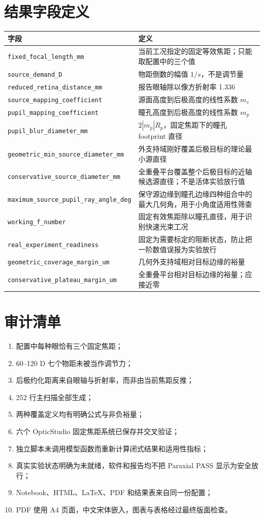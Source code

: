\documentclass[UTF8,zihao=-4,openany,fontset=none]{ctexrep}
\newcommand{\sourcefile}[1]{\nolinkurl{#1}}
\begin{document}
\chapter{结果字段定义}
\begin{longtable}{p{5.4cm}p{9.4cm}}
\toprule
字段 & 定义\\
\midrule
\sourcefile{fixed\_focal\_length\_mm} & 当前工况指定的固定等效焦距；只能取配置中的三个值\\
\sourcefile{source\_demand\_D} & 物距倒数的幅值 $1/s$，不是调节量\\
\sourcefile{reduced\_retina\_distance\_mm} & 报告眼轴除以像方折射率 1.336\\
\sourcefile{source\_mapping\_coefficient} & 源面高度到后极高度的线性系数 $m_s$\\
\sourcefile{pupil\_mapping\_coefficient} & 瞳孔高度到后极高度的线性系数 $m_p$\\
\sourcefile{pupil\_blur\_diameter\_mm} & $2|m_p|R_p$，固定焦距下的瞳孔 footprint 直径\\
\sourcefile{geometric\_min\_source\_diameter\_mm} & 外支持域刚好覆盖后极目标的理论最小源直径\\
\sourcefile{conservative\_source\_diameter\_mm} & 全重叠平台覆盖整个后极目标的近轴候选源直径；不是活体实验放行值\\
\sourcefile{maximum\_source\_pupil\_ray\_angle\_deg} & 保守源边缘到瞳孔边缘四种组合中的最大几何角，用于小角度适用性筛查\\
\sourcefile{working\_f\_number} & 固定有效焦距除以瞳孔直径，用于识别快速光束工况\\
\sourcefile{real\_experiment\_readiness} & 固定为需要标定的阻断状态，防止把一阶数值误报为实验放行\\
\sourcefile{geometric\_coverage\_margin\_um} & 几何外支持域相对目标边缘的裕量\\
\sourcefile{conservative\_plateau\_margin\_um} & 全重叠平台相对目标边缘的裕量；应接近零\\
\bottomrule
\end{longtable}

\chapter{审计清单}
\begin{enumerate}[leftmargin=2.2em]
  \item 配置中每种眼恰有三个固定焦距；
  \item 60--120 D 七个物距未被当作调节力；
  \item 后极约化距离来自眼轴与折射率，而非由当前焦距反推；
  \item 252 行主扫描全部生成；
  \item 两种覆盖定义均有明确公式与非负裕量；
  \item 六个 OpticStudio 固定焦距系统已保存并交叉验证；
  \item 独立脚本未调用模型函数而重新计算闭式结果和适用性指标；
  \item 真实实验状态明确为未就绪，软件和报告均不把 Paraxial PASS 显示为安全放行；
  \item Notebook、HTML、LaTeX、PDF 和结果表来自同一份配置；
  \item PDF 使用 A4 页面，中文宋体嵌入，图表与表格经过最终版面检查。
\end{enumerate}
\end{document}

